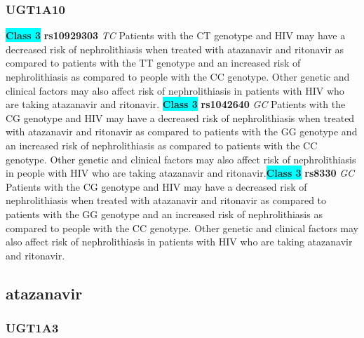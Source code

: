 \documentclass{book}
\begin{document}
\subsubsection{ UGT1A10 }

\begin{center}
\textbf{\colorbox{cyan} {Class 3}} \textbf{ rs10929303 } \textit{ TC }
Patients with the CT genotype and HIV may have a decreased risk of nephrolithiasis when treated with atazanavir and ritonavir as compared to patients with the TT genotype and an increased risk of nephrolithiasis as compared to people with the CC genotype. Other genetic and clinical factors may also affect risk of nephrolithiasis in patients with HIV who are taking atazanavir and ritonavir. \textbf{\colorbox{cyan} {Class 3}} \textbf{ rs1042640 } \textit{ GC }
Patients with the CG genotype and HIV may have a decreased risk of nephrolithiasis when treated with atazanavir and ritonavir as compared to patients with the GG genotype and an increased risk of nephrolithiasis as compared to patients with the CC genotype. Other genetic and clinical factors may also affect risk of nephrolithiasis in people with HIV who are taking atazanavir and ritonavir.\textbf{\colorbox{cyan} {Class 3}} \textbf{ rs8330 } \textit{ GC }
Patients with the CG genotype and HIV may have a decreased risk of nephrolithiasis when treated with atazanavir and ritonavir as compared to patients with the GG genotype and an increased risk of nephrolithiasis as compared to people with the CC genotype. Other genetic and clinical factors may also affect risk of nephrolithiasis in patients with HIV who are taking atazanavir and ritonavir.


\end{center}\subsection{ atazanavir }


\subsubsection{ UGT1A3 }
\end{document}
